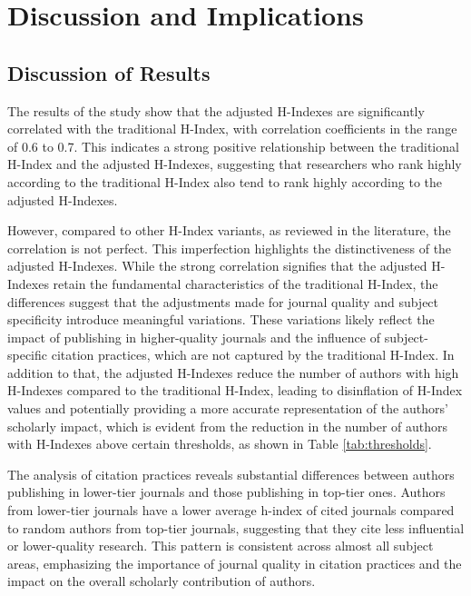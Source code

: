\chapter{Discussion and Implications}
\label{ch:discussion}

\section{Discussion of Results}

The results of the study show that the adjusted H-Indexes are significantly
correlated with the traditional H-Index, with correlation coefficients in the
range of 0.6 to 0.7. This indicates a strong positive relationship between the
traditional H-Index and the adjusted H-Indexes, suggesting that researchers who
rank highly according to the traditional H-Index also tend to rank highly
according to the adjusted H-Indexes.

However, compared to other H-Index variants, as reviewed in the literature, the
correlation is not perfect. This imperfection highlights the distinctiveness of
the adjusted H-Indexes. While the strong correlation signifies that the
adjusted H-Indexes retain the fundamental characteristics of the traditional
H-Index, the differences suggest that the adjustments made for journal quality
and subject specificity introduce meaningful variations. These variations
likely reflect the impact of publishing in higher-quality journals and the
influence of subject-specific citation practices, which are not captured by the
traditional H-Index. In addition to that, the adjusted H-Indexes reduce the
number of authors with high H-Indexes compared to the traditional H-Index,
leading to disinflation of H-Index values and potentially providing a more
accurate representation of the authors' scholarly impact, which is evident from
the reduction in the number of authors with H-Indexes above certain thresholds,
as shown in Table \ref{tab:thresholds}. %

The analysis of citation practices reveals substantial differences between
authors publishing in lower-tier journals and those publishing in top-tier
ones. Authors from lower-tier journals have a lower average h-index of cited
journals compared to random authors from top-tier journals, suggesting that
they cite less influential or lower-quality research. This pattern is
consistent across almost all subject areas, emphasizing the importance of
journal quality in citation practices and the impact on the overall scholarly
contribution of authors.

